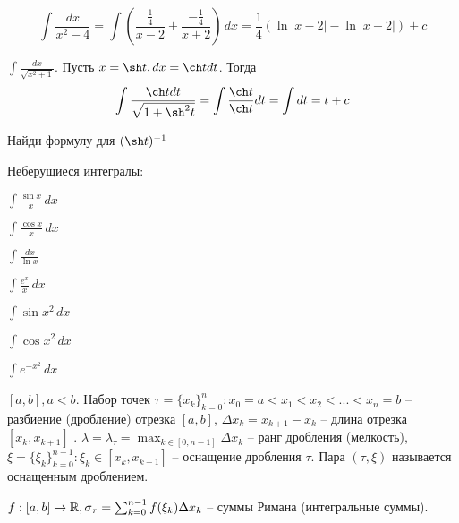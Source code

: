 \begin{Example}[12 и 13 из таблицы]
	\[\int \frac{dx}{x^2 - 4} = \int \left( \frac{\frac{1}{4}}{x - 2} + \frac{-\frac{1}{4}}{x + 2}\right) \,dx = \frac{1}{4} \left(\ln |x - 2| - \ln |x + 2|\right) + c\]	
\end{Example}

\begin{Example}
	$\int \frac{dx}{\sqrt{x^2 + 1}}$. Пусть $x = \sh t, dx = \ch t dt $. Тогда
	\[\int \frac{\ch t dt}{\sqrt{1 + \sh^2 t}} = \int \frac{\ch t}{\ch t} dt = \int dt = t + c\]   
\end{Example}

\begin{Ex}
	Найди формулу для $(\sh t)^{-1}$ 
\end{Ex}

Неберущиеся интегралы:

\begin{multicols}{2}
	\begin{MyItemize}
		\item $\int \frac{\sin x}{x} \,dx$ 
		\item $\int \frac{\cos x}{x} \,dx$ 
		\item $\int \frac{\,dx}{\ln x}$ 
		\item $\int \frac{e^x}{x} \,dx$ 
		\item $\int \sin x^2 \,dx$ 
		\item $\int \cos x^2 \,dx$ 
		\item $\int e^{-x^2}\,dx$ 
	\end{MyItemize}
\end{multicols}


\begin{Def}
	$[a, b], a < b$. Набор точек $\tau = \{x_k\}_{k = 0}^n : x_0 = a < x_1 < x_2 < ... < x_n = b$ -- разбиение (дробление) отрезка $[a, b]$, $\Delta x_k = x_{k + 1} - x_k$ -- длина отрезка $[x_k, x_{k + 1}]$ . 
	$\lambda = \lambda_\tau  = \max_{k \in [0, n - 1]} \Delta x_k$ -- ранг дробления (мелкость), $\xi = \{\xi_k\}_{k = 0}^{n - 1} : \xi_k \in [x_k, x_{k + 1}]$ -- оснащение дробления $\tau$.
	Пара $(\tau, \xi)$ называется оснащенным дроблением.  
\end{Def}

\begin{Def}
	$f : [a, b] \to \mathbb{R}, \sigma_\tau = \sum_{k = 0}^{n - 1} f(\xi_k) \Delta x_k$ -- суммы Римана (интегральные суммы). 
\end{Def}

